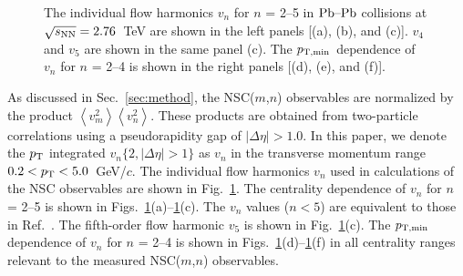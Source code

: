 \begin{figure}[t!]
	\begin{center}
        \caption{The individual flow harmonics $v_n$ for $n$ = 2--5 in $\textnormal{Pb--Pb}$ collisions at $\sqrt{s_{\textnormal{NN}}}=2.76$~TeV are shown in the left panels [(a), (b), and (c)]. $v_4$ and $v_5$ are shown in the same panel (c). The $p_{\rm T, min}$ dependence of $v_n$ for $n$ = 2--4 is shown in the right panels [(d), (e), and (f)].}
        \label{fig:Figure_3}
        \end{center}   
\end{figure}

As discussed in Sec.~\ref{sec:method}, the NSC($m$,$n$) observables are normalized by the product $\left<v_{m}^2\right>\left<v_{n}^2\right>$.
These products are obtained from two-particle correlations using a pseudorapidity gap of $|\Delta\eta| > 1.0$. 
In this paper, we denote the $p_{\rm T}$ integrated $v_{n}\{2, |\Delta\eta|>1\}$ as $v_n$ in the transverse momentum range $0.2<p_{\rm T}<5.0$~GeV/$c$.
The individual flow harmonics $v_n$ used in calculations of the NSC observables are shown in Fig.~\ref{fig:Figure_3}.
The centrality dependence of $v_n$ for $n$ = 2--5 is shown in Figs.~\ref{fig:Figure_3}(a)--\ref{fig:Figure_3}(c). The $v_n$ values ($n < 5$) are equivalent to those in Ref.~\cite{Adam:2016izf}. The fifth-order flow harmonic $v_5$ is shown in Fig.~\ref{fig:Figure_3}(c). The $p_{\rm T, min}$ dependence of $v_n$ for $n$ = 2--4 is shown in Figs.~\ref{fig:Figure_3}(d)--\ref{fig:Figure_3}(f) in all centrality ranges relevant to the measured NSC($m$,$n$) observables.

